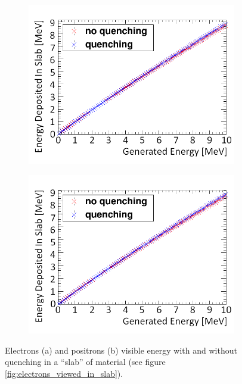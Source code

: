 \begin{figure}[!h]
\centering
\begin{subfigure}{.45\textwidth}
  \centering
  \includegraphics[width=\linewidth]{Chapter4/Figs/Raster/quenchedElectronsNew.png}
  \captionsetup{width=.9\linewidth}
  \caption{}
  \label{subFig:electron_quenched_and_not}
\end{subfigure}%
\begin{subfigure}{.45\textwidth}
  \centering
  \includegraphics[width=\linewidth]{Chapter4/Figs/Raster/quenchedPositronsNew.png}
  \captionsetup{width=.9\linewidth}
  \caption{}
  \label{subFig:positron_quenched_and_not}
\end{subfigure}
\caption{Electrons (a) and positrons (b) visible energy with and without quenching in a ``slab'' of material (see figure \ref{fig:electrons_viewed_in_slab}).}
\label{fig:electron_positron_quenched_and_not}
\end{figure}


